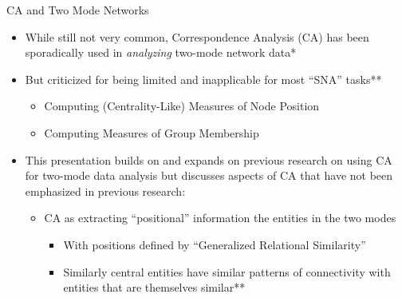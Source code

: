 \documentclass[
  ignorenonframetext,
]{beamer}
\providecommand{\tightlist}{%
  \setlength{\itemsep}{0pt}\setlength{\parskip}{0pt}}\usepackage{longtable,booktabs,array}
\begin{document}
\begin{frame}{CA and Two Mode Networks}
\protect\hypertarget{ca-and-two-mode-networks-3}{}
\begin{itemize}
\tightlist
\item
  While still not very common, Correspondence Analysis (CA) has been
  sporadically used in \emph{analyzing} two-mode network data*
\item
  But criticized for being limited and inapplicable for most ``SNA''
  tasks**

  \begin{itemize}
  \tightlist
  \item
    Computing (Centrality-Like) Measures of Node Position
  \item
    Computing Measures of Group Membership
  \end{itemize}
\item
  This presentation builds on and expands on previous research on using
  CA for two-mode data analysis but discusses aspects of CA that have
  not been emphasized in previous research:

  \begin{itemize}
  \tightlist
  \item
    CA as extracting ``positional'' information the entities in the two
    modes

    \begin{itemize}
    \tightlist
    \item
      With positions defined by ``Generalized Relational Similarity''
    \item
      Similarly central entities have similar patterns of connectivity
      with entities that are themselves similar**
    \end{itemize}
  \end{itemize}
\end{itemize}

\end{frame}
\end{document}
